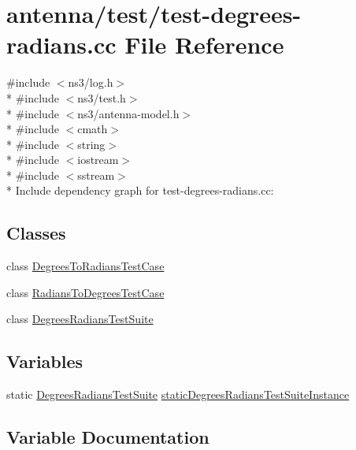 \hypertarget{test-degrees-radians_8cc}{}\section{antenna/test/test-\/degrees-\/radians.cc File Reference}
\label{test-degrees-radians_8cc}
{\ttfamily \#include $<$ns3/log.\+h$>$}\\*
{\ttfamily \#include $<$ns3/test.\+h$>$}\\*
{\ttfamily \#include $<$ns3/antenna-\/model.\+h$>$}\\*
{\ttfamily \#include $<$cmath$>$}\\*
{\ttfamily \#include $<$string$>$}\\*
{\ttfamily \#include $<$iostream$>$}\\*
{\ttfamily \#include $<$sstream$>$}\\*
Include dependency graph for test-\/degrees-\/radians.cc\+:
\subsection*{Classes}
\begin{DoxyCompactItemize}
\item 
class \hyperlink{classDegreesToRadiansTestCase}{Degrees\+To\+Radians\+Test\+Case}
\item 
class \hyperlink{classRadiansToDegreesTestCase}{Radians\+To\+Degrees\+Test\+Case}
\item 
class \hyperlink{classDegreesRadiansTestSuite}{Degrees\+Radians\+Test\+Suite}
\end{DoxyCompactItemize}
\subsection*{Variables}
\begin{DoxyCompactItemize}
\item 
static \hyperlink{classDegreesRadiansTestSuite}{Degrees\+Radians\+Test\+Suite} \hyperlink{test-degrees-radians_8cc_a818fbf5d137492edf84710c1358b2383}{static\+Degrees\+Radians\+Test\+Suite\+Instance}
\end{DoxyCompactItemize}


\subsection{Variable Documentation}
